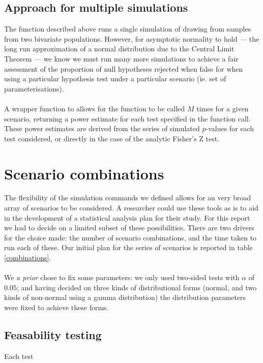 \subsection{Approach for multiple simulations}
The function described above runs a single simulation of drawing from samples from two bivariate populations.  However, for asymptotic normality to hold --- the long run approximation of a normal distribution due to the Central Limit Theorem \cite{Casella2002} --- we know we must run many more simulations to achieve a fair assessment of the proportion of null hypotheses rejected when false for when using a particular hypothesis test under a particular scenario (ie. set of parameterisations).
\\
\\
A wrapper function  to allows for the  function to be called $M$ times for a given scenario, returning a power estimate for each test specified in the function call.  These power estimates are derived from the series of simulated $p$-values for each test considered, or directly in the case of the analytic Fisher's Z test.

\section{Scenario combinations}
The flexibility of the simulation commands we defined allows for an very broad array of scenarios to be considered.  A researcher could use these tools as is to aid in the development of a statistical analysis plan for their study.  For this report we had to decide on a limited subset of these possibilities.  There are two drivers for the choice made: the number of scenario combinations, and the time taken to run each of these.  Our initial plan for the series of scenarios is reported in table \ref{combinations}.
\\
\\
We \textit{a prior} chose to fix some parameters: we only used two-sided tests with $\alpha$ of 0.05; and having decided on three kinds of distributional forms (normal, and two kinds of non-normal using a gamma distribution) the distribution parameters were fixed to achieve these forms.

\subsection{Feasability testing}
Each test 


